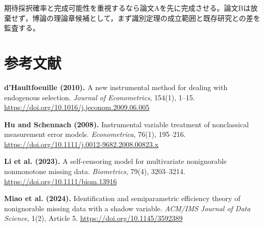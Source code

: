 \documentclass[a4paper,11pt,xelatex,ja=standard]{bxjsarticle}
\begin{document}
期待採択確率と完成可能性を重視するなら論文Aを先に完成させる。論文Bは放棄せず，博論の理論章候補として，まず識別定理の成立範囲と既存研究との差を監査する。
\begin{center}
\end{center}

\section*{参考文献}

\noindent\textbf{d'Haultfoeuille (2010).}
A new instrumental method for dealing with endogenous selection. \textit{Journal of Econometrics}, 154(1), 1--15. \url{https://doi.org/10.1016/j.jeconom.2009.06.005}

\noindent\textbf{Hu and Schennach (2008).}
Instrumental variable treatment of nonclassical measurement error models. \textit{Econometrica}, 76(1), 195--216. \url{https://doi.org/10.1111/j.0012-9682.2008.00823.x}

\noindent\textbf{Li et al. (2023).}
A self-censoring model for multivariate nonignorable nonmonotone missing data. \textit{Biometrics}, 79(4), 3203--3214. \url{https://doi.org/10.1111/biom.13916}

\noindent\textbf{Miao et al. (2024).}
Identification and semiparametric efficiency theory of nonignorable missing data with a shadow variable. \textit{ACM/IMS Journal of Data Science}, 1(2), Article 5. \url{https://doi.org/10.1145/3592389}
\end{document}
